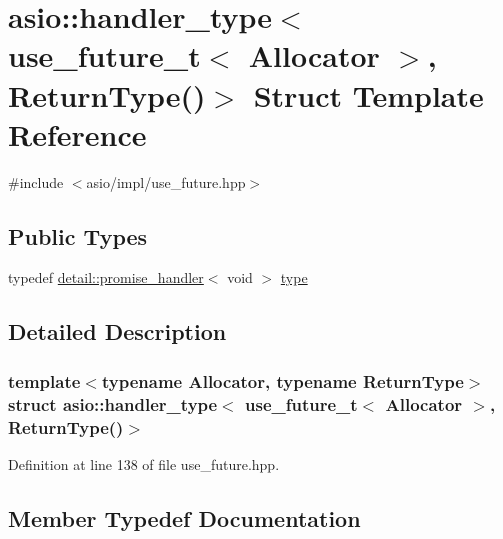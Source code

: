 \hypertarget{structasio_1_1handler__type_3_01use__future__t_3_01_allocator_01_4_00_01_return_type_07_08_4}{}\section{asio\+:\+:handler\+\_\+type$<$ use\+\_\+future\+\_\+t$<$ Allocator $>$, Return\+Type()$>$ Struct Template Reference}
\label{structasio_1_1handler__type_3_01use__future__t_3_01_allocator_01_4_00_01_return_type_07_08_4}


{\ttfamily \#include $<$asio/impl/use\+\_\+future.\+hpp$>$}

\subsection*{Public Types}
\begin{DoxyCompactItemize}
\item 
typedef \hyperlink{classasio_1_1detail_1_1promise__handler}{detail\+::promise\+\_\+handler}$<$ void $>$ \hyperlink{structasio_1_1handler__type_3_01use__future__t_3_01_allocator_01_4_00_01_return_type_07_08_4_a398b4ea023b61d222b8070f86d931240}{type}
\end{DoxyCompactItemize}


\subsection{Detailed Description}
\subsubsection*{template$<$typename Allocator, typename Return\+Type$>$struct asio\+::handler\+\_\+type$<$ use\+\_\+future\+\_\+t$<$ Allocator $>$, Return\+Type()$>$}



Definition at line 138 of file use\+\_\+future.\+hpp.



\subsection{Member Typedef Documentation}
\hypertarget{structasio_1_1handler__type_3_01use__future__t_3_01_allocator_01_4_00_01_return_type_07_08_4_a398b4ea023b61d222b8070f86d931240}{}
